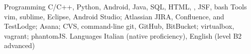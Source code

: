 \begin{cvskills}
  \cvskill
    {Programming}
    {C/C++, Python, Android, Java, SQL, HTML, \LaTeXe{}, JSF, bash}
  \cvskill
  {Tools}
  {vim, sublime, Eclipse, Android Studio;
   Atlassian JIRA, Confluence, and
   TestLodge;  Asana;
   CVS, command-line git, GitHub, BitBucket;
   virtualbox, vagrant; phantomJS.
  }
  \cvskill
    {Languages}
    {Italian (native proficiency), English 
   (level B2 advanced)}


\end{cvskills}
